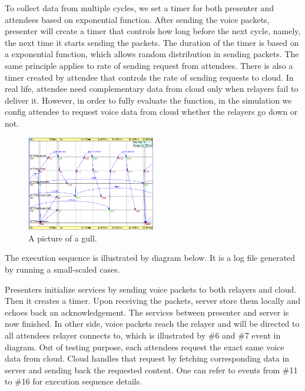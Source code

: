 To collect data from multiple cycles, we set a timer for both presenter and 
attendees based on exponential function. After sending the voice packets, 
presenter will create a timer that controls how long before the next cycle, 
namely, the next time it starts sending the packets. The duration of the timer 
is based on a exponential function, which allows random distribution in sending 
packets. The same principle applies to rate of sending request from attendees. 
There is also a timer created by attendee that controls the rate of sending 
requests to cloud. In real life, attendee need complementary data from cloud 
only when relayers fail to deliver it. However, in order to fully evaluate the 
function, in the simulation we config attendee to request voice data from cloud 
whether the relayers go down or not.

\begin{figure}[h!]
  \centering
    \includegraphics[width=0.5\textwidth]{figures/r_seq.png}
  \caption{A picture of a gull.}
\end{figure}

The execution sequence is illustrated by diagram below. It is a log file 
generated by running a small-scaled cases. 

Presenters initialize services by sending voice packets to both relayers and 
cloud. Then it creates a timer. Upon receiving the packets, server store them 
locally and echoes back an acknowledgement. The services between presenter and 
server is now finished. In other side,
voice packets reach the relayer and will be directed to all attendees relayer 
connects to, which is illustrated by \#6 and \#7 event in diagram. Out of 
testing purpose, each attendees request the exact same voice data from cloud. 
Cloud handles that request by fetching corresponding data in server and sending 
back the requested content. One can refer to events from \#11 to \#16 for 
execution sequence details. 
 


